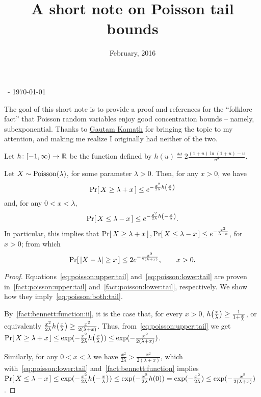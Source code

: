 \documentclass[10pt]{article}
\title{A short note on Poisson tail bounds}
\date{February, 2016}
\newcommand{\bennettfunc}{h}
\newcommand{\bennett}[1]{\bennettfunc\mleft(#1\mright)}
\begin{document}
\begin{flushleft}\sf\footnotesize
\makeatletter
\@date~- \today \hfill \@title
\makeatother
\end{flushleft}
\vspace{5mm}

The goal of this short note is to provide a proof and references for the ``folklore fact'' that Poisson random variables enjoy good concentration bounds -- namely, subexponential. Thanks to \href{http://www.gautamkamath.com/}{Gautam Kamath} for bringing the topic to my attention, and making me realize I originally had neither of the two.\bigskip

\noindent Let $\bennettfunc\colon[-1,\infty) \to \R$ be the function defined by $h(u)\eqdef 2\frac{(1+u)\ln(1+u)-u}{u^2}$.

\begin{theorem}\label{theo:main:poisson:bounds}
Let $X\sim\operatorname{Poisson}\!\left( \lambda \right) $, for some parameter $\lambda > 0$. Then, for any $x>0$, we have
\begin{equation}\label{eq:poisson:upper:tail}
    \probaOf{ X \geq \lambda + x} \leq e^{-\frac{x^2}{2\lambda}\bennett{\frac{x}{\lambda}}}
\end{equation}
and, for any $0<x< \lambda$,
\begin{equation}\label{eq:poisson:lower:tail}
  \probaOf{ X \leq \lambda - x} \leq e^{-\frac{x^2}{2\lambda}\bennett{-\frac{x}{\lambda}}}.
\end{equation}
In particular, this implies that $\Pr\!\left[\,  X \geq \lambda + x\, \right],\Pr\!\left[\,  X \leq \lambda - x\, \right] \leq e^{-\frac{x^2}{\lambda+x}}$, for $x>0$; from which
\begin{equation}\label{eq:poisson:both:tail}
  \Pr\!\left[\,  \left\lvert X -\lambda \right\rvert \geq x\, \right] \leq 2e^{-\frac{x^2}{2(\lambda+x)}}, \qquad x>0.
\end{equation}
\end{theorem}
\begin{proof}
Equations~\eqref{eq:poisson:upper:tail} and~\eqref{eq:poisson:lower:tail} are proven in~\autoref{fact:poisson:upper:tail} and~\autoref{fact:poisson:lower:tail}, respectively. We show how they imply~\eqref{eq:poisson:both:tail}.

\noindent By~\autoref{fact:bennett:function:ii}, it is the case that,  for every $x>0$, $\bennett{\frac{x}{\lambda}} \geq \frac{1}{1+\frac{x}{\lambda}}$, or equivalently
$
\frac{x^2}{2\lambda} \bennett{\frac{x}{\lambda}} \geq \frac{x^2}{2(\lambda+x)}
$. Thus, from~\eqref{eq:poisson:upper:tail} we get $\probaOf{ X \geq \lambda + x} \leq \exp(-\frac{x^2}{2\lambda}\bennett{\frac{x}{\lambda}}) \leq \exp(-\frac{x^2}{2(\lambda+x)})$.

\noindent Similarly, for any $0<x<\lambda$ we have $\frac{x^2}{2\lambda} > \frac{x^2}{2(\lambda+x)}$, which with~\eqref{eq:poisson:lower:tail} and~\autoref{fact:bennett:function} implies
$
\probaOf{ X \leq \lambda - x} \leq \exp(-\frac{x^2}{2\lambda}\bennett{-\frac{x}{\lambda}}) \leq \exp(-\frac{x^2}{2\lambda}\bennett{0}) = \exp(-\frac{x^2}{2\lambda}) \leq \exp(-\frac{x^2}{2(\lambda+x)})
$.
\end{proof}
\end{document}
